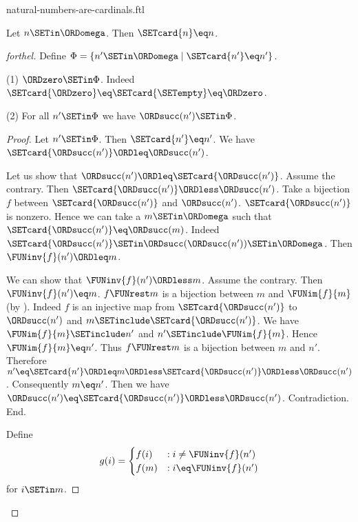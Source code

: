 \documentclass{naproche-library}
\begin{document}
\begin{smodule}[title=Natural Numbers are Cardinal Numbers]{natural-numbers-are-cardinals.ftl}

\begin{theorem}[forthel,id=SET_THEORY_07_2948332552978432]
  Let $n \SETin \ORDomega$.
  Then $\SETcard{n} \eq n$.
\end{theorem}
\begin{proof}[forthel]
  Define $\Phi = \{ n' \SETin \ORDomega \mid \SETcard{n'} \eq n' \}$.

  (1) $\ORDzero \SETin \Phi$.
  Indeed $\SETcard{\ORDzero} \eq \SETcard{\SETempty} \eq \ORDzero$.

  (2) For all $n' \SETin \Phi$ we have $\ORDsucc(n') \SETin \Phi$.
  \begin{proof}
    Let $n' \SETin \Phi$.
    Then $\SETcard{n'} \eq n'$.
    We have $\SETcard{\ORDsucc(n')} \ORDleq \ORDsucc(n')$.

    Let us show that $\ORDsucc(n') \ORDleq \SETcard{\ORDsucc(n')}$.
      Assume the contrary.
      Then $\SETcard{\ORDsucc(n')} \ORDless \ORDsucc(n')$.
      Take a bijection $f$ between $\SETcard{\ORDsucc(n')}$ and $\ORDsucc(n')$.
      $\SETcard{\ORDsucc(n')}$ is nonzero.
      Hence we can take a $m \SETin \ORDomega$ such that $\SETcard{\ORDsucc(n')} \eq \ORDsucc(m)$.
      Indeed $\SETcard{\ORDsucc(n')} \SETin \ORDsucc(\ORDsucc(n')) \SETin \ORDomega$.
      Then $\FUNinv{f}(n') \ORDleq m$.

      We can show that $\FUNinv{f}(n') \ORDless m$.
        Assume the contrary.
        Then $\FUNinv{f}(n') \eq m$.
        $f \FUNrest m$ is a bijection between $m$ and $\FUNim{f}{m}$ (by ).
        Indeed $f$ is an injective map from $\SETcard{\ORDsucc(n')}$ to $\ORDsucc(n')$ and
        $m \SETinclude \SETcard{\ORDsucc(n')}$.
        We have $\FUNim{f}{m} \SETinclude n'$ and $n' \SETinclude \FUNim{f}{m}$.
        Hence $\FUNim{f}{m} \eq n'$.
        Thus $f \FUNrest m$ is a bijection between $m$ and $n'$.
        Therefore $n'
          \eq \SETcard{n'}
          \ORDleq m
          \ORDless \SETcard{\ORDsucc(n')}
          \ORDless \ORDsucc(n')$.
        Consequently $m \eq n'$.
        Then we have $\ORDsucc(n') \eq \SETcard{\ORDsucc(n')} \ORDless \ORDsucc(n')$.
        Contradiction.
      End.

      Define \[ g(i) =
        \begin{cases}
          f(i)  & : i \neq \FUNinv{f}(n')
          \\
          f(m)  & : i \eq \FUNinv{f}(n')
        \end{cases} \]
      for $i \SETin m$.


\end{proof}
\end{proof}
\end{smodule}
\end{document}
